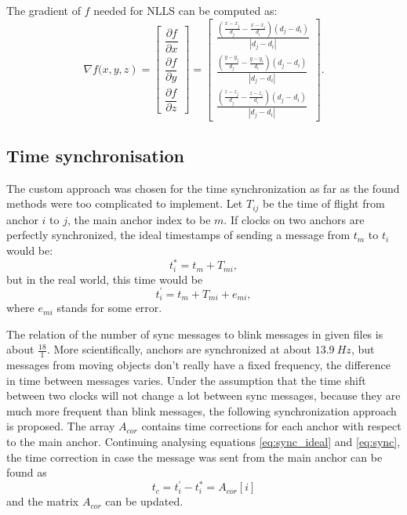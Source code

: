 \documentclass[10pt,journal,compsoc]{IEEEtran}
\begin{document}
The gradient of $f$ needed for NLLS can be computed as:
\begin{equation}
    \nabla f(\left.x, y, z\right)=\left[\begin{array}{c}
    \dfrac{\partial f}{\partial x}\\
    \dfrac{\partial f}{\partial y}\\
    \dfrac{\partial f}{\partial z}
    \end{array}\right] = \left[\begin{array}{c}
    \frac{(\frac{x-x_j}{d_j} - \frac{x-x_i}{d_i})(d_j - d_i)}{|d_j - d_i|}\\
    \frac{(\frac{y-y_j}{d_j} - \frac{y-y_i}{d_i})(d_j - d_i)}{|d_j - d_i|}\\
    \frac{(\frac{z-z_j}{d_j} - \frac{z-z_i}{d_i})(d_j - d_i)}{|d_j - d_i|}
    \end{array}\right].
\end{equation}

\subsection{Time synchronisation}
\label{sec:time_sync}
The custom approach was chosen for the time synchronization as far as the found methods were too complicated to implement. 
Let $T_{ij}$ be the time of flight from anchor $i$ to $j$, the main anchor index to be $m$.
If clocks on two anchors are perfectly synchronized, the ideal timestamps of sending a message from $t_m$ to $t_i$ would be:
\begin{equation}
    \label{eq:sync_ideal}
    t_{i}^* = t_m + T_{mi},
\end{equation}
but in the real world, this time would be
\begin{equation}
    \label{eq:sync}
    t_{i}^{'} = t_m + T_{mi} + e_{mi},
\end{equation}
where $e_{mi}$ stands for some error. 

The relation of the number of sync messages to blink messages in given files is about $\frac{18}{1}$. 
More scientifically, anchors are synchronized at about $\SI{13.9}{Hz}$, but messages from moving objects don't really have a fixed frequency, the difference in time between messages varies.
Under the assumption that the time shift between two clocks will not change a lot between sync messages, because they are much more frequent than blink messages, the following synchronization approach is proposed.
The array $A_{cor}$ contains time corrections for each anchor with respect to the main anchor. 
Continuing analysing equations \eqref{eq:sync_ideal} and \eqref{eq:sync}, the time correction in case the message was sent from the main anchor can be found as
\begin{equation}
    t_{c} = t_i^{'} - t_i^{*} = A_{cor}[i]
\end{equation}
and the matrix $A_{cor}$ can be updated.
\end{document}
